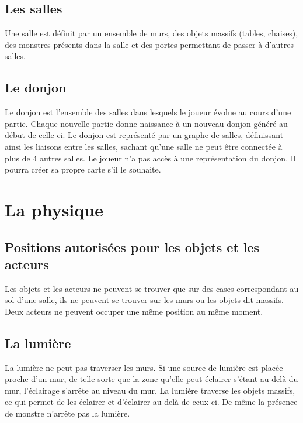 \documentclass[a4paper, 11pt]{report}
\begin{document}
        \subsection{Les salles}
          Une salle est définit par un ensemble de murs, des objets massifs (tables, chaises), des monstres
          présents dans la salle et des portes permettant de passer à d'autres salles.
          
        \subsection{Le donjon}
          Le donjon est l'ensemble des salles dans lesquels le joueur évolue au cours d'une partie. Chaque
          nouvelle partie donne naissance à un nouveau donjon généré au début de celle-ci. 
          Le donjon est représenté par un graphe de
          salles, définissant ainsi les liaisons entre les salles, sachant qu'une salle ne peut   \^etre connectée
          à plus de 4 autres salles. Le joueur n'a pas accès à une représentation du donjon. Il pourra créer sa
          propre carte s'il le souhaite.

      \section{La physique}
        
        \subsection{Positions autorisées pour les objets et les acteurs}
          Les objets et les acteurs ne peuvent se trouver que sur des cases correspondant au sol d'une salle, 
          ils ne peuvent se trouver sur les murs ou les objets dit massifs. Deux acteurs ne peuvent occuper
          une m\^eme position au m\^eme moment.
        
        \subsection{La lumière}
          La lumière ne peut pas traverser les murs. Si une source de lumière est placée proche d'un mur, de
          telle sorte que la zone qu'elle peut éclairer s'étant au delà du mur, l'éclairage s'arrête au niveau
          du mur. La lumière traverse les objets massifs, ce qui permet de les éclairer et d'éclairer au delà de
          ceux-ci. De même la présence de monstre n'arrête pas la lumière.
          
\end{document}
